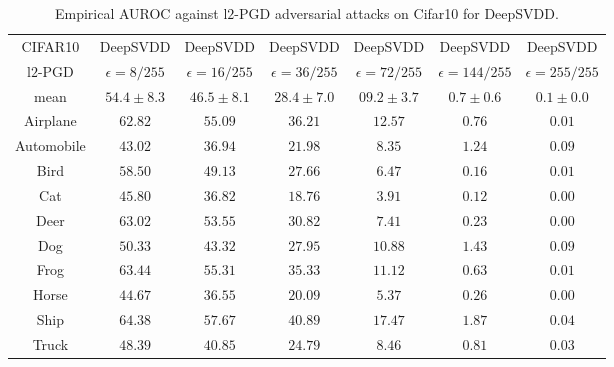 \begin{table}%
    \centering
    \small
    \begin{tabular}{|c|cccccc|}
    \hline
      CIFAR10 & DeepSVDD & DeepSVDD & DeepSVDD & DeepSVDD & DeepSVDD & DeepSVDD \\
      l$2$-PGD & $\epsilon=8/255$ & $\epsilon=16/255$ & $\epsilon=36/255$ & $\epsilon=72/255$ & $\epsilon=144/255$ & $\epsilon=255/255$\\
    \hline
    \hline
    mean & $54.4\pm 8.3$ & $46.5\pm 8.1$ & $28.4\pm 7.0$ & $09.2\pm 3.7$ & $0.7\pm 0.6$ & $0.1\pm 0.0$\\
    \hline
    Airplane & $62.82$ & $55.09$ & $36.21$ & $12.57$ & $0.76$ & $0.01$\\
    Automobile & $43.02$ & $36.94$ & $21.98$ & $8.35$ & $1.24$ & $0.09$\\
    Bird & $58.50$ & $49.13$ & $27.66$ & $6.47$ & $0.16$ & $0.01$\\
    Cat & $45.80$ & $36.82$ & $18.76$ & $3.91$ & $0.12$ & $0.00$\\
    Deer & $63.02$ & $53.55$ & $30.82$ & $7.41$ & $0.23$ & $0.00$\\
    Dog & $50.33$ & $43.32$ & $27.95$ & $10.88$ & $1.43$ & $0.09$\\
    Frog & $63.44$ & $55.31$ & $35.33$ & $11.12$ & $0.63$ & $0.01$\\
    Horse & $44.67$ & $36.55$ & $20.09$ & $5.37$ & $0.26$ & $0.00$\\
    Ship & $64.38$ & $57.67$ & $40.89$ & $17.47$ & $1.87$ & $0.04$\\
    Truck & $48.39$ & $40.85$ & $24.79$ & $8.46$ & $0.81$ & $0.03$\\
    \hline
    \end{tabular}
    \caption{Empirical AUROC against l$2$-PGD adversarial attacks on Cifar10 for DeepSVDD.}
    \label{tab:empiricalcifar10svdd}
\end{table}

